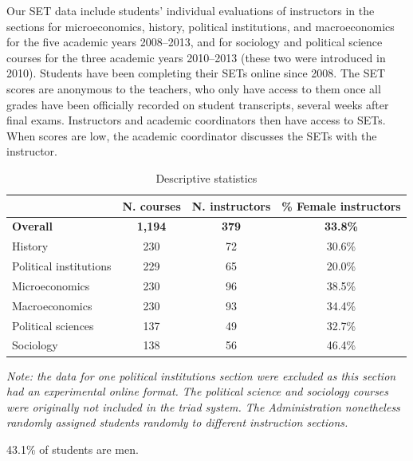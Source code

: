 \documentclass[12pt]{article}
\begin{document}
Our SET data include students' individual evaluations of instructors in the sections for microeconomics, history, political institutions, and macroeconomics for the five academic years 2008--2013, and for sociology and political science courses for the three academic years 2010--2013 
(these two were introduced in 2010). Students have been completing their SETs online since 2008. The SET scores are
anonymous to the teachers, who only have access to them once all grades have been officially recorded on student transcripts, several weeks after final exams. Instructors and academic coordinators then have access to SETs. When scores are low, the academic coordinator discusses the SETs with the instructor.   
 


\begin{table}[htbp]
  \centering
  \footnotesize 
  \caption{Descriptive statistics}
    \begin{tabular}{lccc}
    \toprule 
                        & N. courses & N. instructors  & \% Female instructors  \\
   \midrule
  \textbf{Overall} &  \textbf{1,194} & \textbf{379}  &\textbf{33.8\%} \\
    History    &               230 &      72          &   30.6\% \\
    Political institutions  &  229 &      65          &   20.0\% \\    
    Microeconomics   &         230 &      96          &   38.5\% \\
    Macroeconomics   &         230 &      93          &   34.4\% \\
    Political sciences &       137 &      49          &   32.7\% \\
    Sociology   &              138 &      56          &   46.4\%    \\
    \bottomrule
    \end{tabular}%
 \label{tab:description}%
 
\textit{Note: the data for one political institutions section were excluded as this section had an experimental online format. The political science and sociology courses were originally not included in the triad system. The Administration nonetheless randomly assigned students randomly to different instruction sections.} 

\end{table}%
\normalsize

43.1\% of students are men. 
\end{document}
